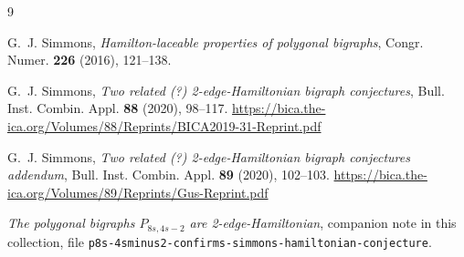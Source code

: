 \documentclass[11pt]{amsart}
\begin{document}
\begin{thebibliography}{9}

G.~J. Simmons,
\emph{Hamilton-laceable properties of polygonal bigraphs},
Congr. Numer. \textbf{226} (2016), 121--138.

G.~J. Simmons,
\emph{Two related (?) 2-edge-Hamiltonian bigraph conjectures},
Bull. Inst. Combin. Appl. \textbf{88} (2020), 98--117.
\url{https://bica.the-ica.org/Volumes/88/Reprints/BICA2019-31-Reprint.pdf}

G.~J. Simmons,
\emph{Two related (?) 2-edge-Hamiltonian bigraph conjectures addendum},
Bull. Inst. Combin. Appl. \textbf{89} (2020), 102--103.
\url{https://bica.the-ica.org/Volumes/89/Reprints/Gus-Reprint.pdf}

\emph{The polygonal bigraphs $P_{8s,4s-2}$ are 2-edge-Hamiltonian},
companion note in this collection, file
\texttt{p8s-4sminus2-\allowbreak confirms-simmons-hamiltonian-conjecture}.

\end{thebibliography}
\end{document}
